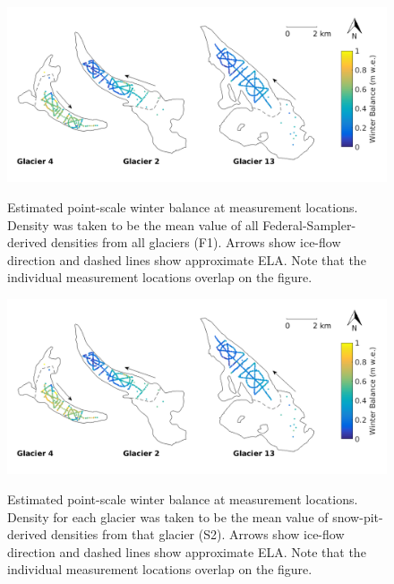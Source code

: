 \documentclass{sfuthesis}
\begin{document}
\begin{figure}[H]
	\centering
	\includegraphics[width = \textwidth]{SWEmap_opt3.png}\\
	\caption{Estimated point-scale winter balance at measurement locations. Density was taken to be the mean value of all Federal-Sampler-derived densities from all glaciers (F1). Arrows show ice-flow direction and dashed lines show approximate ELA. Note that the individual measurement locations overlap on the figure.}
	\label{fig:SWEmap_F1}
\end{figure}

\begin{figure}[H]
	\centering
	\includegraphics[width =\textwidth]{SWEmap_opt4.png}\\
	\caption{Estimated point-scale winter balance at measurement locations. Density for each glacier was taken to be the mean value of snow-pit-derived densities from that glacier (S2). Arrows show ice-flow direction and dashed lines show approximate ELA. Note that the individual measurement locations overlap on the figure.}
	\label{fig:SWEmap_S2}
\end{figure}
\end{document}
